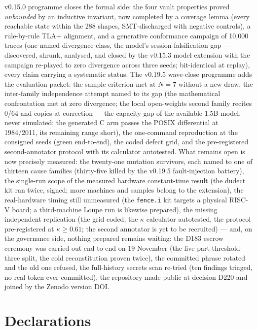 \documentclass[11pt,a4paper]{article}
\newcommand{\code}[1]{\texttt{\small #1}}
\begin{document}
v0.15.0 programme closes the formal side: the four vault
properties proved \emph{unbounded} by an inductive invariant, now
completed by a coverage lemma (every reachable state within the 288
shapes, SMT-discharged with negative controls), a rule-by-rule TLA+
alignment, and a generative conformance campaign of 10{,}000 traces
(one named divergence class, the model's session-falsification gap ---
discovered, shrunk, analysed, and closed by the v0.15.3 model
extension with the campaign re-played to zero divergence across three
seeds; bit-identical at replay), every claim carrying a systematic
status. The v0.19.5 wave-close programme adds the evaluation packet:
the sample criterion met at $N{=}7$ without a new draw, the
inter-family independence attempt named to its gap (the mathematical
confrontation met at zero divergence; the local open-weights second
family recites 0/64 and copies at correction --- the capacity gap of
the available 1.5B model, never simulated; the generated C arm passes
the POSIX differential at 1984/2011, its remaining range short), the
one-command reproduction at the consigned seeds (green end-to-end),
the coded defect grid, and the pre-registered second-annotator
protocol with its calculator autotested. What remains open
is now precisely measured: the twenty-one mutation survivors, each
named to one of thirteen cause families (thirty-five killed by the
v0.19.5 fault-injection battery), the single-run scope of the measured hardware constant-time
result (the dudect kit ran twice, signed; more machines and samples
belong to the extension), the real-hardware
timing still unmeasured (the \code{fence.i} kit targets a physical RISC-V
board; a third-machine Loupe run is likewise prepared), the missing
independent replication
(the grid coded, the $\kappa$ calculator autotested, the protocol
pre-registered at $\kappa\ge0.61$; the second annotator is yet to be
recruited) --- and, on the governance side, nothing prepared remains
waiting: the D183 escrow ceremony was carried out end-to-end on 19 November
(the five-part threshold-three split, the cold reconstitution proven
twice), the committed phrase rotated and the old one refused, the
full-history secrets scan re-tried (ten findings triaged, no real
token ever committed), the repository made public at decision D220 and
joined by the Zenodo version DOI.

\section*{Declarations}
\end{document}
